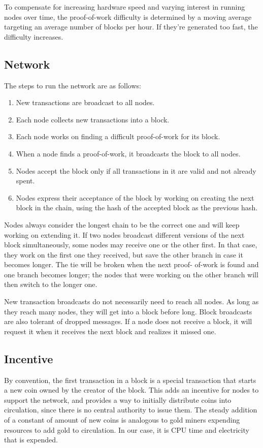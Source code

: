 \documentclass[11pt]{article}
\begin{document}
To compensate for increasing hardware speed and varying interest in running nodes over time, the proof-of-work difficulty is determined by a moving average targeting an average number of blocks per hour.
If they're generated too fast, the difficulty increases.

\subsection{Network}
\label{sec:org6537538}
The steps to run the network are as follows:

\begin{enumerate}
\item New transactions are broadcast to all nodes.
\item Each node collects new transactions into a block.
\item Each node works on finding a difficult proof-of-work for its block.
\item When a node finds a proof-of-work, it broadcasts the block to all nodes.
\item Nodes accept the block only if all transactions in it are valid and not already spent.
\item Nodes express their acceptance of the block by working on creating the next block in the chain, using the hash of the accepted block as the previous hash.
\end{enumerate}

Nodes always consider the longest chain to be the correct one and will keep working on extending it.
If two nodes broadcast different versions of the next block simultaneously, some nodes may receive one or the other first.
In that case, they work on the first one they received, but save the other branch in case it becomes longer.
The tie will be broken when the next proof- of-work is found and one branch becomes longer; the nodes that were working on the other branch will then switch to the longer one.

New transaction broadcasts do not necessarily need to reach all nodes.
As long as they reach many nodes, they will get into a block before long.
Block broadcasts are also tolerant of dropped messages.
If a node does not receive a block, it will request it when it receives the next block and realizes it missed one.

\subsection{Incentive}
\label{sec:org60f6c07}
By convention, the first transaction in a block is a special transaction that starts a new coin owned by the creator of the block.
This adds an incentive for nodes to support the network, and provides a way to initially distribute coins into circulation, since there is no central authority to issue them.
The steady addition of a constant of amount of new coins is analogous to gold miners expending resources to add gold to circulation.
In our case, it is CPU time and electricity that is expended.
\end{document}
